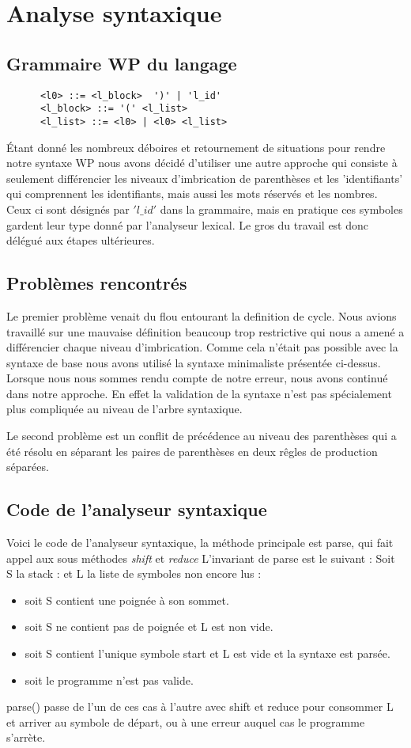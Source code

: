 \chapter{Analyse syntaxique}
  \section{Grammaire WP du langage} 
    \begin{verbatim}
      <l0> ::= <l_block>  ')' | 'l_id'
      <l_block> ::= '(' <l_list>
      <l_list> ::= <l0> | <l0> <l_list>
    \end{verbatim}
    Étant donné les nombreux déboires et retournement de situations
    pour rendre notre syntaxe WP nous avons décidé d'utiliser une
    autre approche qui consiste à seulement différencier les niveaux d'imbrication de parenthèses 
    et les 'identifiants' qui 
    comprennent les identifiants, mais aussi les mots réservés et les 
    nombres. Ceux ci sont désignés par $'l\_id'$ dans la grammaire, mais
    en pratique ces symboles gardent leur type donné par l'analyseur
    lexical. Le gros du travail est donc délégué aux étapes ultérieures.
  \section{Problèmes rencontrés}
    Le premier problème venait du flou entourant la definition de cycle.
    Nous avions travaillé sur une mauvaise définition beaucoup trop 
    restrictive qui nous a amené a différencier chaque niveau d'imbrication.
    Comme cela n'était pas possible avec la syntaxe de base nous avons utilisé
    la syntaxe minimaliste présentée ci-dessus. Lorsque nous nous sommes rendu
    compte de notre erreur, nous avons continué dans notre approche. En effet
    la validation de la syntaxe n'est pas spécialement plus compliquée au niveau
    de l'arbre syntaxique. 
    
    Le second problème est un conflit de précédence au niveau des parenthèses
    qui a été résolu en séparant les paires de parenthèses en deux rêgles
    de production séparées.
  \section{Code de l'analyseur syntaxique}
  Voici le code de l'analyseur syntaxique, la méthode principale est parse, qui fait
  appel aux sous méthodes \emph{shift} et \emph{reduce} L'invariant de parse est le
  suivant : Soit S la stack : et L la liste de symboles non encore lus :
  \begin{itemize}
    \item soit S contient une poignée à son sommet.
    \item soit S ne contient pas de poignée et L est non vide. 
    \item soit S contient l'unique symbole start et L est vide et la syntaxe est parsée.
    \item soit le programme n'est pas valide. 
  \end{itemize}
  parse() passe de l'un de ces cas à l'autre avec shift et reduce pour consommer L et arriver au
  symbole de départ, ou à une erreur auquel cas le programme s'arrète. 

